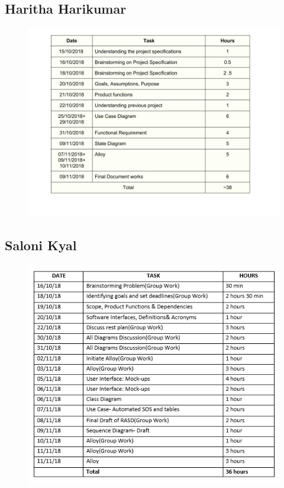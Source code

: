 \subsection{Haritha Harikumar}
\begin{figure}[H]
	\begin{center}
		\includegraphics[width=\textwidth]{./RASD_Diagrams/Effort_Haritha.jpg}
	\end{center}
\end{figure}
\subsection{Saloni Kyal}
\begin{figure}[H]
	\begin{center}
		\includegraphics[width=\textwidth]{./RASD_Diagrams/Effort_Saloni.PNG}
	\end{center}
\end{figure}
